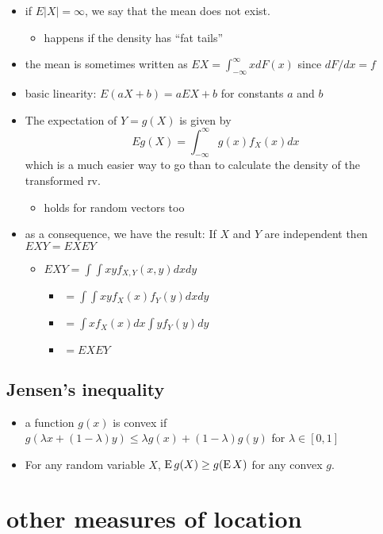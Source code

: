 \begin{itemize}
\item if $E|X| = \infty$, we say that the mean does not exist.
\begin{itemize}
\item happens if the density has ``fat tails''
\end{itemize}
\item the mean is sometimes written as $EX = \int_{-\infty}^{\infty} x
       dF(x)$ since $dF/dx = f$
\item basic linearity: $E(a X + b) = a E X + b$ for constants $a$
       and $b$
\item The expectation of $Y = g(X)$ is given by \[ E g(X) =
       \int_{-\infty}^\infty g(x) f_X(x) dx \] which is a much
       easier way to go than to calculate the density
       of the transformed rv.
\begin{itemize}
\item holds for random vectors too
\end{itemize}
\item as a consequence, we have the result: If $X$ and $Y$ are
       independent then $E XY = EX E Y$
\begin{itemize}
\item $EXY = \int\int x y f_{X,Y}(x,y) dx dy$
\begin{itemize}
\item $= \int\int xy f_X(x) f_Y(y) dx dy$
\item $= \int x f_X(x) dx \int y f_Y(y) dy$
\item $= EX EY$
\end{itemize}
\end{itemize}
\end{itemize}

\subsection{Jensen's inequality}

\begin{itemize}
\item a function $g(x)$ is convex if $g(\lambda x + (1-\lambda)y)
       \leq \lambda g(x) + (1-\lambda) g(y)$ for $\lambda \in [0,1]$
\item For any random variable $X$, $\operatorname{E} g(X) \geq g(\operatorname{E} X)$ for any
       convex $g$.
\end{itemize}

\section{other measures of location}


